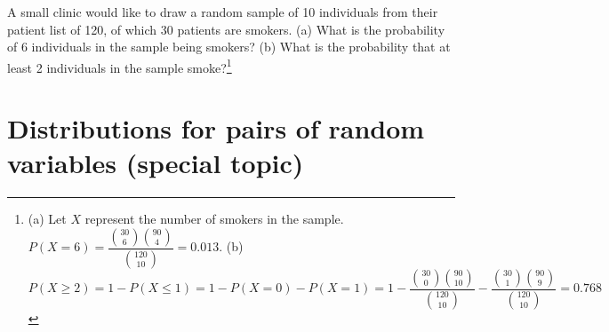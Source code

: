 \begin{exercise}{A small clinic would like to draw a random sample of 10 individuals from their patient list of 120, of which 30 patients are smokers. (a) What is the probability of 6 individuals in the sample being smokers? (b) What is the probability that at least 2 individuals in the sample smoke?\footnote{(a) Let $X$ represent the number of smokers in the sample. $P(X = 6) = \dfrac{{30 \choose 6}{90 \choose 4}}{{120 \choose 10}} = 0.013$. (b) $P(X \geq 2) = 1 - P(X \leq 1) = 1 - P(X = 0) - P(X = 1) = 1 - \dfrac{{30 \choose 0}{90 \choose 10}}{{120 \choose 10}} - \dfrac{{30 \choose 1}{90 \choose 9}}{{120 \choose 10}} = 0.768$ }}
	
	
\end{exercise}


\newpage

\section{Distributions for pairs of random variables (special topic)}
\label{correlatedRVs}


